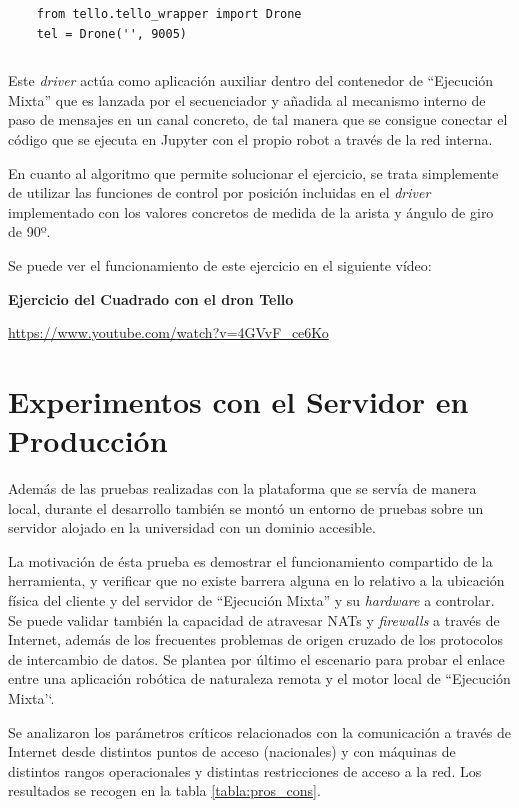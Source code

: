 \begin{verbatim}
    from tello.tello_wrapper import Drone
    tel = Drone('', 9005)
\end{verbatim}
\begin{lstlisting}[caption=Uso del Driver]
\end{lstlisting}

Este \textit{driver} actúa como aplicación auxiliar dentro del contenedor de ``Ejecución Mixta'' que es lanzada por el secuenciador y añadida al mecanismo interno de paso de mensajes en un canal concreto, de tal manera que se consigue conectar el código que se ejecuta en Jupyter con el propio robot a través de la red interna.

En cuanto al algoritmo que permite solucionar el ejercicio, se trata simplemente de utilizar las funciones de control por posición incluidas en el \textit{driver} implementado con los valores concretos de medida de la arista y ángulo de giro de 90º.

Se puede ver el funcionamiento de este ejercicio en el siguiente vídeo:

\textbf{Ejercicio del Cuadrado con el dron Tello}

\url{https://www.youtube.com/watch?v=4GVvF_ce6Ko}

\section{Experimentos con el Servidor en Producción}

Además de las pruebas realizadas con la plataforma que se servía de manera local, durante el desarrollo también se montó un entorno de pruebas sobre un servidor alojado en la universidad con un dominio accesible.

La motivación de ésta prueba es demostrar el funcionamiento compartido de la herramienta, y verificar que no existe barrera alguna en lo relativo a la ubicación física del cliente y del servidor de ``Ejecución Mixta'' y su \textit{hardware} a controlar. Se puede validar también la capacidad de atravesar NATs y \textit{firewalls} a través de Internet, además de los frecuentes problemas de origen cruzado de los protocolos de intercambio de datos. Se plantea por último el escenario para probar el enlace entre una aplicación robótica de naturaleza remota y el motor local de ``Ejecución Mixta'`.

Se analizaron los parámetros críticos relacionados con la comunicación a través de Internet desde distintos puntos de acceso (nacionales) y con máquinas de distintos rangos operacionales y distintas restricciones de acceso a la red. Los resultados se recogen en la tabla \ref{tabla:pros_cons}.

